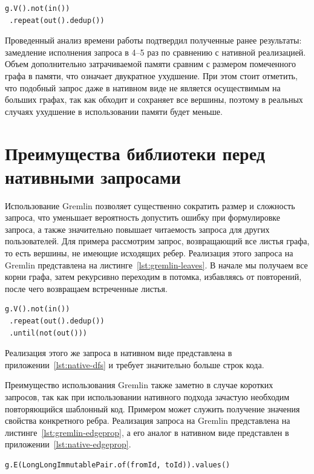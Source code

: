 \documentclass[times,specification,annotation]{itmo-student-thesis}
\begin{document}
\begin{lstlisting}[float=!h,caption={Запрос, обходящий весь граф},label={lst:gremlin-dfs}]
g.V().not(in())
 .repeat(out().dedup())
\end{lstlisting}

Проведенный анализ времени работы подтвердил полученные ранее результаты: замедление исполнения запроса в 4--5 раз по сравнению с нативной реализацией. Объем дополнительно затрачиваемой памяти сравним с размером помеченного графа в памяти, что означает двукратное ухудшение. При этом стоит отметить, что подобный запрос даже в нативном виде не является осуществимым на больших графах, так как обходит и сохраняет все вершины, поэтому в реальных случаях ухудшение в использовании памяти будет меньше.

\section{Преимущества библиотеки перед нативными запросами}

Использование Gremlin позволяет существенно сократить размер и сложность запроса, что уменьшает вероятность допустить ошибку при формулировке запроса, а также значительно повышает читаемость запроса для других пользователей. Для примера рассмотрим запрос, возвращающий все листья графа, то есть вершины, не имеющие исходящих ребер. Реализация этого запроса на Gremlin представлена на листинге~\ref{lst:gremlin-leaves}. В начале мы получаем все корни графа, затем рекурсивно переходим в потомка, избавляясь от повторений, после чего возвращаем встреченные листья.

\begin{lstlisting}[float=!h,caption={Получение листьев графа на Gremlin},label={lst:gremlin-leaves}]
g.V().not(in())
 .repeat(out().dedup())
 .until(not(out()))
\end{lstlisting}

Реализация этого же запроса в нативном виде представлена в приложении~\ref{lst:native-dfs} и требует значительно больше строк кода.

Преимущество использования Gremlin также заметно в случае коротких запросов, так как при использовании нативного подхода зачастую необходим повторяющийся шаблонный код. Примером может служить получение значения свойства конкретного ребра. Реализация запроса на Gremlin представлена на листинге~\ref{lst:gremlin-edgeprop}, а его аналог в нативном виде представлен в приложении~\ref{lst:native-edgeprop}.

\begin{lstlisting}[float=!h,caption={Получение свойства ребра на Gremlin},label={lst:gremlin-edgeprop}]
g.E(LongLongImmutablePair.of(fromId, toId)).values()
\end{lstlisting}
\end{document}
